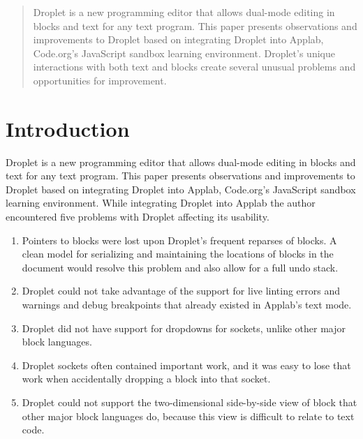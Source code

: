 \documentclass[conference]{IEEEtran}
\begin{document}
\begin{abstract}
Droplet is a new programming editor that allows dual-mode editing in blocks and text for any text program. This paper presents observations and improvements to Droplet based on integrating Droplet into Applab, Code.org's JavaScript sandbox learning environment. Droplet's unique interactions with both text and blocks create several unusual problems and opportunities for improvement.

\end{abstract}





%
\IEEEpeerreviewmaketitle

\section{Introduction}
Droplet \cite{Droplet} is a new programming editor that allows dual-mode editing in blocks and text for any text program. This paper presents observations and improvements to Droplet based on integrating Droplet into Applab, Code.org's \cite{Code.org} JavaScript sandbox learning environment. While integrating Droplet into Applab the author encountered five problems with Droplet affecting its usability.

\begin{enumerate}
  \item Pointers to blocks were lost upon Droplet's frequent reparses of blocks. A clean model for serializing and maintaining the locations of blocks in the document would resolve this problem and also allow for a full undo stack.
  \item Droplet could not take advantage of the support for live linting errors and warnings and debug breakpoints that already existed in Applab's text mode.
  \item Droplet did not have support for dropdowns for sockets, unlike other major block languages.
  \item Droplet sockets often contained important work, and it was easy to lose that work when accidentally dropping a block into that socket.
  \item Droplet could not support the two-dimensional side-by-side view of block that other major block languages do, because this view is difficult to relate to text code.
\end{enumerate}
\end{document}
